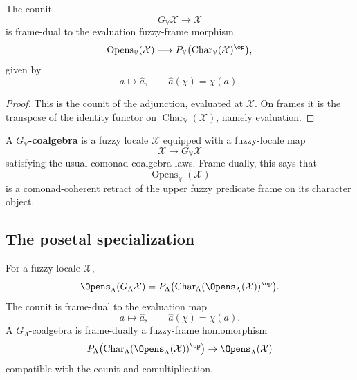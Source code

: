 \begin{proposition}
\label{prop:alexandrov-character-comonad-counit}
The counit
\[
    G_{\mathbb V}\mathcal X\to\mathcal X
\]
is frame-dual to the evaluation fuzzy-frame morphism
\[
    \operatorname{Opens}_{\mathbb V}(\mathcal X)
    \longrightarrow
    P_{\mathbb V}
    \bigl(
        \operatorname{Char}_{\mathbb V}(\mathcal X)^{\op}
    \bigr),
\]
given by
\[
    a\longmapsto \widehat a,
    \qquad
    \widehat a(\chi)=\chi(a).
\]
\end{proposition}

\begin{proof}
This is the counit of the adjunction, evaluated at \(\mathcal X\).  On frames it is
the transpose of the identity functor on
\(\operatorname{Char}_{\mathbb V}(\mathcal X)\), namely evaluation.
\end{proof}

\begin{definition}
\label{def:alexandrov-character-coalgebra}
A \textbf{\(G_{\mathbb V}\)-coalgebra} is a fuzzy locale \(\mathcal X\) equipped
with a fuzzy-locale map
\[
    \mathcal X\to G_{\mathbb V}\mathcal X
\]
satisfying the usual comonad coalgebra laws.  Frame-dually, this says that
\[
    \operatorname{Opens}_{\mathbb V}(\mathcal X)
\]
is a comonad-coherent retract of the upper fuzzy predicate frame on its character
object.
\end{definition}

\subsection{The posetal specialization}
\label{subsec:alexandrov-character-comonad-posetal}

\begin{proposition}
\label{prop:posetal-character-comonad}
For a fuzzy locale \(\mathcal X\),
\[
    \Opens_\Lambda(G_\Lambda\mathcal X)
    =
    P_\Lambda
    \bigl(
        \operatorname{Char}_\Lambda(\Opens_\Lambda(\mathcal X))^{\op}
    \bigr).
\]
The counit is frame-dual to the evaluation map
\[
    a\longmapsto \widehat a,
    \qquad
    \widehat a(\chi)=\chi(a).
\]
A \(G_\Lambda\)-coalgebra is frame-dually a fuzzy-frame homomorphism
\[
    P_\Lambda
    \bigl(
        \operatorname{Char}_\Lambda(\Opens_\Lambda(\mathcal X))^{\op}
    \bigr)
    \to
    \Opens_\Lambda(\mathcal X)
\]
compatible with the counit and comultiplication.
\end{proposition}

